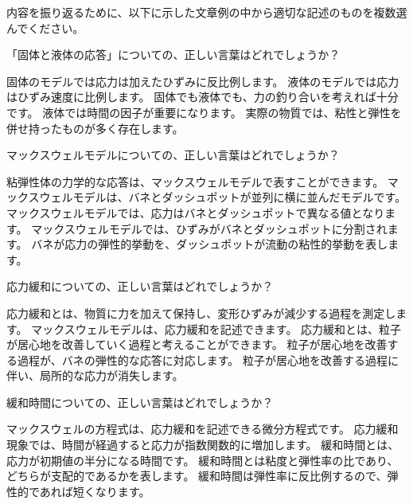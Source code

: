 \documentclass[uplatex,dvipdfmx,a4paper,11pt]{jsarticle}
\begin{document}
内容を振り返るために、以下に示した文章例の中から適切な記述のものを複数選んでください。
\begin{qlist}
	\qitem 「固体と液体の応答」についての、正しい言葉はどれでしょうか？
		\begin{qlist2}
			\qitem 固体のモデルでは応力は加えたひずみに反比例します。
			\qitem 液体のモデルでは応力はひずみ速度に比例します。
			\qitem 固体でも液体でも、力の釣り合いを考えれば十分です。
			\qitem 液体では時間の因子が重要になります。
			\qitem 実際の物質では、粘性と弾性を併せ持ったものが多く存在します。
		\end{qlist2}
		\vspace{3mm}

	\qitem マックスウェルモデルについての、正しい言葉はどれでしょうか？
		\begin{qlist2}
			\qitem 粘弾性体の力学的な応答は、マックスウェルモデルで表すことができます。
			\qitem マックスウェルモデルは、バネとダッシュポットが並列に横に並んだモデルです。
			\qitem マックスウェルモデルでは、応力はバネとダッシュポットで異なる値となります。
			\qitem マックスウェルモデルでは、ひずみがバネとダッシュポットに分割されます。
			\qitem バネが応力の弾性的挙動を、ダッシュポットが流動の粘性的挙動を表します。
		\end{qlist2}
		\vspace{3mm}

	\qitem 応力緩和についての、正しい言葉はどれでしょうか？
		\begin{qlist2}
			\qitem 応力緩和とは、物質に力を加えて保持し、変形ひずみが減少する過程を測定します。
			\qitem マックスウェルモデルは、応力緩和を記述できます。
			\qitem 応力緩和とは、粒子が居心地を改善していく過程と考えることができます。
			\qitem 粒子が居心地を改善する過程が、バネの弾性的な応答に対応します。
			\qitem 粒子が居心地を改善する過程に伴い、局所的な応力が消失します。
		\end{qlist2}
		\vspace{3mm}

	\qitem 緩和時間についての、正しい言葉はどれでしょうか？
		\begin{qlist2}
			\qitem マックスウェルの方程式は、応力緩和を記述できる微分方程式です。
			\qitem 応力緩和現象では、時間が経過すると応力が指数関数的に増加します。
			\qitem 緩和時間とは、応力が初期値の半分になる時間です。
			\qitem 緩和時間とは粘度と弾性率の比であり、どちらが支配的であるかを表します。
			\qitem 緩和時間は弾性率に反比例するので、弾性的であれば短くなります。
		\end{qlist2}
		\vspace{3mm}


\end{qlist}
\end{document}
